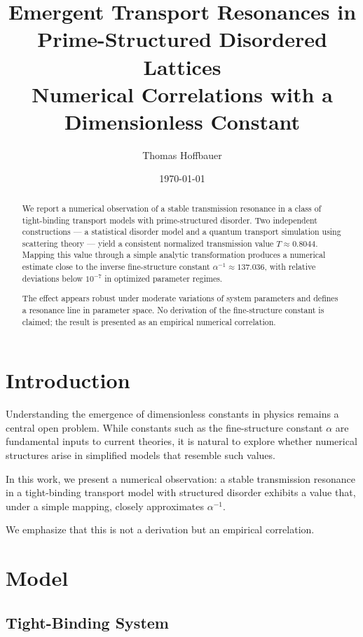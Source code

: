 \documentclass[11pt]{article}
\title{\textbf{Emergent Transport Resonances in Prime-Structured Disordered Lattices}\\
\large Numerical Correlations with a Dimensionless Constant}
\author{Thomas Hoffbauer}
\date{\today}
\begin{document}
\maketitle

\begin{abstract}
We report a numerical observation of a stable transmission resonance in a class of tight-binding transport models with prime-structured disorder. Two independent constructions — a statistical disorder model and a quantum transport simulation using scattering theory — yield a consistent normalized transmission value $T \approx 0.8044$. Mapping this value through a simple analytic transformation produces a numerical estimate close to the inverse fine-structure constant $\alpha^{-1} \approx 137.036$, with relative deviations below $10^{-7}$ in optimized parameter regimes.

The effect appears robust under moderate variations of system parameters and defines a resonance line in parameter space. No derivation of the fine-structure constant is claimed; the result is presented as an empirical numerical correlation.
\end{abstract}

\section{Introduction}

Understanding the emergence of dimensionless constants in physics remains a central open problem. While constants such as the fine-structure constant $\alpha$ are fundamental inputs to current theories, it is natural to explore whether numerical structures arise in simplified models that resemble such values.

In this work, we present a numerical observation: a stable transmission resonance in a tight-binding transport model with structured disorder exhibits a value that, under a simple mapping, closely approximates $\alpha^{-1}$.

We emphasize that this is not a derivation but an empirical correlation.

\section{Model}

\subsection{Tight-Binding System}
\end{document}
